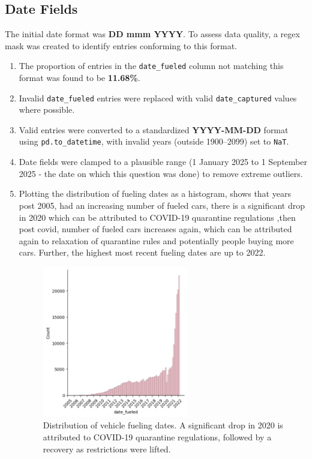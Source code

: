 \documentclass{article}
\begin{document}
\subsection{Date Fields}
The initial date format was \textbf{DD mmm YYYY}. To assess data quality, a regex mask was created to identify entries conforming to this format.
\begin{enumerate}
    \item The proportion of entries in the \texttt{date\_fueled} column not matching this format was found to be \textbf{11.68\%}.
    \item Invalid \texttt{date\_fueled} entries were replaced with valid \texttt{date\_captured} values where possible.
    \item Valid entries were converted to a standardized \textbf{YYYY-MM-DD} format using \texttt{pd.to\_datetime}, with invalid years (outside 1900--2099) set to \texttt{NaT}.
    \item Date fields were clamped to a plausible range (1 January 2025 to 1 September 2025 - the date on which this question was done) to remove extreme outliers.
    \item Plotting the distribution of fueling dates as a histogram, shows that years post 2005, had an increasing number of fueled cars, there is a significant drop in 2020 which can be attributed to COVID-19 quarantine regulations ,then post covid, number of fueled cars increases again, which can be attributed again to relaxation of quarantine rules and potentially people buying more cars. Further, the highest most recent fueling dates are up to 2022.

    \begin{figure}[htbp]
    \centering
    \includegraphics[width=0.6\textwidth]{images/fueled_dates_histo.png}
    \caption{Distribution of vehicle fueling dates. A significant drop in 2020 is attributed to COVID-19 quarantine regulations, followed by a recovery as restrictions were lifted.}
    \label{fig:fuel_dates}
\end{figure}
 
\end{enumerate}
\end{document}
